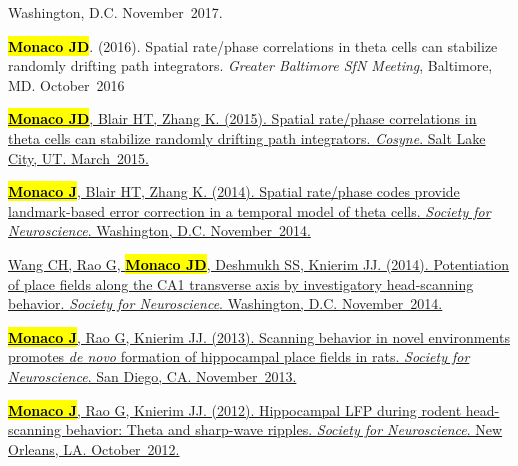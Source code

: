 \documentclass[10pt]{article}
\newcommand{\itemtitle}[1]{{\color{hopkinsblue}\ul{#1}}}
\newcommand{\unpubtitle}[1]{{\color{hopkinsblue} #1}}
\newcommand{\joehl}[1]{\hl{\textbf{#1}}}
\begin{document}
\begin{description}
{    Washington, D.C. November~2017.}
  \item[\quad]
    \joehl{Monaco JD}. (2016). \unpubtitle{Spatial rate/phase correlations in
    theta cells can stabilize randomly drifting path integrators}. \emph{Greater
    Baltimore SfN Meeting}, Baltimore, MD. October~2016
  \item[\quad]
    \href{https://jdmonaco.com/files/monaco-paper-cosyne15.pdf}
    {\joehl{Monaco JD}, Blair HT, Zhang K. (2015). \itemtitle{Spatial
        rate/phase correlations in theta cells can stabilize randomly drifting path
    integrators}. \emph{Cosyne}. Salt Lake City, UT. March~2015.}
  \item[\quad]
    \href{https://www.abstractsonline.com/Plan/ViewAbstract.aspx?sKey=973d2662-ba7a-4ad2-aff9-fe0d4b77c262&cKey=9917ffaf-9e31-4213-acb9-4aab498ab4cd&mKey=54c85d94-6d69-4b09-afaa-502c0e680ca7}
    {\joehl{Monaco J}, Blair HT, Zhang K. (2014). \itemtitle{Spatial rate/phase
        codes provide landmark-based error correction in a temporal model of theta
    cells}. \emph{Society for Neuroscience}. Washington, D.C.  November~2014.}
  \item[\quad]
    \href{https://www.abstractsonline.com/Plan/ViewAbstract.aspx?sKey=bfb59866-8deb-44a6-9515-a7aab630507b&cKey=d201b3aa-7725-452e-b0dd-c41d204b5b54&mKey=54c85d94-6d69-4b09-afaa-502c0e680ca7}
    {Wang CH, Rao G, \joehl{Monaco JD}, Deshmukh SS, Knierim JJ. (2014).
      \itemtitle{Potentiation of place fields along the CA1 transverse axis by
      investigatory head-scanning behavior}. \emph{Society for Neuroscience}. 
    Washington, D.C. November~2014.}
  \item[\quad]
    \href{https://www.abstractsonline.com/Plan/ViewAbstract.aspx?sKey=32eccac1-4e1d-4e81-bf5c-f39bcb605757&cKey=4710dece-cc8e-4b48-8764-49ea174b91ef&mKey=8d2a5bec-4825-4cd6-9439-b42bb151d1cf}
    {\joehl{Monaco J}, Rao G, Knierim JJ. (2013). \itemtitle{Scanning behavior
        in novel environments promotes \emph{de novo} formation of hippocampal place
    fields in rats}. \emph{Society for Neuroscience}. San Diego, CA. November~2013.}
  \item[\quad]
    \href{https://www.abstractsonline.com/Plan/ViewAbstract.aspx?sKey=f5b9fa94-7d15-48c7-9d67-b89cd2883025&cKey=a53349ca-41b1-4664-b022-85d0d1fe59b8&mKey=70007181-01C9-4DE9-A0A2-EEBFA14CD9F1}
    {\joehl{Monaco J}, Rao G, Knierim JJ. (2012). \itemtitle{Hippocampal LFP
      during rodent head-scanning behavior: Theta and sharp-wave ripples}.
    \emph{Society for Neuroscience}. New Orleans, LA. October~2012.}

\end{description}
\end{document}
